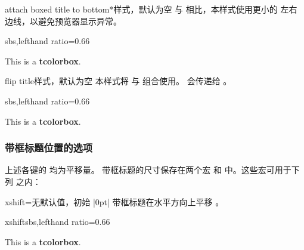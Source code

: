 \begin{docTcbKey}[][doc new=2016-02-26]{attach boxed title to bottom*}{}{样式，默认为空}
  与  相比，本样式使用更小的
  左右边线，以避免预览器显示异常。
\begin{dispExample*}{sbs,lefthand ratio=0.66}
\begin{tcolorbox}[enhanced,title=My title,
  attach boxed title to bottom*]
  This is a \textbf{tcolorbox}.
\end{tcolorbox}
\end{dispExample*}
\end{docTcbKey}

\begin{docTcbKey}[][doc new=2016-02-26]{flip title}{}{样式，默认为空}
  本样式将 
  与  组合使用。
  会传递给 。
\begin{dispExample*}{sbs,lefthand ratio=0.66}
\begin{tcolorbox}[tile,flip title={sharp corners},
  title=My title,colback=red!10,
  colbacktitle=red!75!black]
  This is a \textbf{tcolorbox}.
\end{tcolorbox}
\end{dispExample*}
\end{docTcbKey}

\clearpage

\subsubsection{带框标题位置的选项}
上述各键的  均为平移量。
带框标题的尺寸保存在两个宏
 和
 中。这些宏可用于下列
 之内：

\begin{boxTcbKey}{xshift}{=}{无默认值，初始 |0pt|}
带框标题在水平方向上平移 。
\begin{exdispExample*}{xshift}{sbs,lefthand ratio=0.66}
\begin{tcolorbox}[enhanced,title=My title,
  attach boxed title to top left={xshift=-2mm},
  boxed title style={size=small,colback=blue}]
  This is a \textbf{tcolorbox}.
\end{tcolorbox}
\end{exdispExample*}
\end{boxTcbKey}

